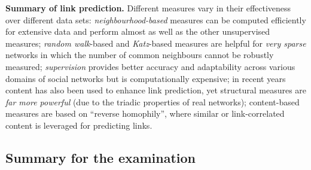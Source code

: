 \documentclass[11pt,a4paper]{article}
\theoremstyle{definition}
\providecommand{\uv}[1]{``#1''}
\begin{document}
\textbf{Summary of link prediction.} Different measures vary in their effectiveness over different data
sets: \emph{neighbourhood-based} measures can be computed efficiently for extensive data and perform
almost as well as the other unsupervised measures; \emph{random walk}-based and \emph{Katz}-based
measures are helpful for \emph{very sparse} networks in which the number of common neighbours cannot be
robustly measured; \emph{supervision} provides better accuracy and adaptability across various domains
of social networks but is computationally expensive; in recent years content has also been used to
enhance link prediction, yet structural measures are \emph{far more powerful} (due to the triadic
properties of real networks); content-based measures are based on \uv{reverse homophily}, where similar
or link-correlated content is leveraged for predicting links.

\subsection{Summary for the examination}
\end{document}
